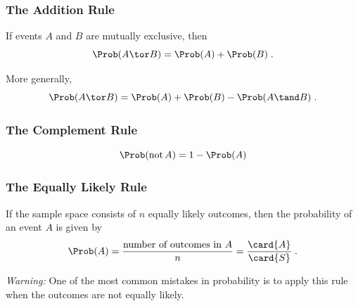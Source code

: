 \documentclass[twoside]{book}\usepackage[]{graphicx}\usepackage[]{xcolor}
\def\tnot{\operatorname{not}}
\begin{document}
\subsubsection*{The Addition Rule}

If events $A$  and $B$ are mutually exclusive, then 
\[
\Prob(A \tor B) = \Prob(A) + \Prob(B)
\; .
\]

More generally,
\[
\Prob(A \tor B) = \Prob(A) + \Prob(B) - \Prob(A \tand B)
\; .
\]


\subsubsection*{The Complement Rule}

\[
\Prob(\tnot A) = 1 - \Prob(A)
\]


\subsubsection*{The Equally Likely Rule}

If the sample space consists of $n$ equally likely outcomes, then
the probability of an event $A$ is given by
\[
\Prob(A) = \frac{ \mbox{number of outcomes in $A$}}{n}
=\frac{ \card{A} }{\card{S} }\; .
\]

\emph{Warning:} One of the most common mistakes in probability is to apply this rule
when the outcomes are not equally likely.
\end{document}
